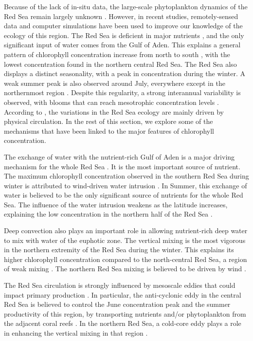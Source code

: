 Because of the lack of in-situ data, the large-scale phytoplankton dynamics of the Red Sea remain largely unknown \citep{Raitsos2013, Triantafyllou2014}. However, in recent studies, remotely-sensed data and computer simulations have been used to improve our knowledge of the ecology of this region. The Red Sea is deficient in major nutrients \citep{Weikert1987}, and the only significant input of water comes from the Gulf of Aden. This explains a general pattern of chlorophyll concentration increase from north to south \citep{Raitsos2013}, with the lowest concentration found in the northern central Red Sea. The Red Sea also displays a distinct seasonality, with a peak in concentration during the winter. A weak summer peak is also observed around July, everywhere except in the northernmost region \citep{Raitsos2013}. Despite this regularity, a strong interannual variability is observed, with blooms that can reach mesotrophic concentration levels \citep{Raitsos2013}. According to \citet{Triantafyllou2014}, the variations in the Red Sea ecology are mainly driven by physical circulation. In the rest of this section, we explore some of the mechanisms that have been linked to the major features of chlorophyll concentration.

The exchange of water with the nutrient-rich Gulf of Aden is a major driving mechanism for the whole Red Sea \citep{Triantafyllou2014}. It is the most important source of nutrient. The maximum chlorophyll concentration observed in the southern Red Sea during winter is attributed to wind-driven water intrusion \citep{Raitsos2013}. In Summer, this exchange of water is believed to be the only significant source of nutrients for the whole Red Sea. The influence of the water intrusion weakens as the latitude increases, explaining the low concentration in the northern half of the Red Sea \citep{Raitsos2013}.

Deep convection also plays an important role in allowing nutrient-rich deep water to mix with water of the euphotic zone. The vertical mixing is the most vigorous in the northern extremity of the Red Sea during the winter. This explains its higher chlorophyll concentration compared to the north-central Red Sea, a region of weak mixing \citep{Raitsos2013}. The northern Red Sea mixing is believed to be driven by wind \citep{Raitsos2013}.

The Red Sea circulation is strongly influenced by mesoscale eddies \citep{Yao2014, Zhan2014} that could impact primary production \citep{Zhai2013}. In particular, the anti-cyclonic eddy in the central Red Sea is believed to control the June concentration peak and the summer productivity of this region, by transporting nutrients and/or phytoplankton from the adjacent coral reefs \citep{Raitsos2013}. In the northern Red Sea, a cold-core eddy plays a role in enhancing the vertical mixing in that region \citep{Raitsos2013}.

